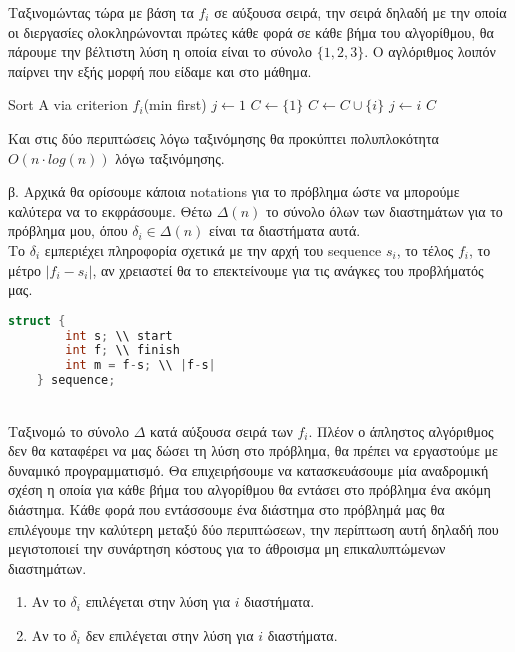 \documentclass{article} \usepackage[greek,english]{babel}
\begin{document}
Ταξινομώντας τώρα με βάση τα $f_i$ σε αύξουσα σειρά, την σειρά δηλαδή με την οποία οι διεργασίες ολοκληρώνονται
πρώτες κάθε φορά σε κάθε βήμα του αλγορίθμου, θα πάρουμε την βέλτιστη λύση η οποία είναι το σύνολο
$\{1,2,3\}$. Ο αγλόριθμος λοιπόν παίρνει την εξής μορφή που είδαμε και στο μάθημα. \\

    \begin{algorithm}
        \caption{$Sequences\_2(S)$}
        \begin{algorithmic}[1]
        \State Sort A via criterion $f_i$(min first)
        \State $j \leftarrow 1$
        \State $C \leftarrow \{1\}$ 
                \State $C \leftarrow C \cup \{i\}$
                \State $j \leftarrow i$
            \EndIf
        \EndFor
        \Return $C$

        \end{algorithmic}
    \end{algorithm}

Και στις δύο περιπτώσεις λόγω ταξινόμησης θα προκύπτει πολυπλοκότητα $O(n\cdot log(n))$ λόγω
ταξινόμησης.

\pagebreak

β. Αρχικά θα ορίσουμε κάποια notations για το πρόβλημα ώστε να μπορούμε καλύτερα να το εκφράσουμε.
Θέτω $\Delta(n)$ το σύνολο όλων των διαστημάτων για το πρόβλημα μου, όπου $\delta_i \in \Delta(n)$ είναι τα 
διαστήματα αυτά. \\
Το $\delta_i$ εμπεριέχει πληροφορία σχετικά με την αρχή του sequence $s_i$, το τέλος $f_i$, το μέτρο
$|f_i - s_i|$, αν χρειαστεί θα το επεκτείνουμε για τις ανάγκες του προβλήματός μας. \\

\begin{lstlisting}[language=C++]
    struct { 
        int s; \\ start
        int f; \\ finish
        int m = f-s; \\ |f-s|
    } sequence;
\end{lstlisting} \\

Ταξινομώ το σύνολο $\Delta$ κατά αύξουσα σειρά των $f_i$. Πλέον ο άπληστος αλγόριθμος δεν θα καταφέρει
να μας δώσει τη λύση στο πρόβλημα, θα πρέπει να εργαστούμε με δυναμικό προγραμματισμό. Θα επιχειρήσουμε
να κατασκευάσουμε μία αναδρομική σχέση η οποία για κάθε βήμα του αλγορίθμου θα εντάσει στο πρόβλημα
ένα ακόμη διάστημα. Κάθε φορά που εντάσσουμε ένα διάστημα στο πρόβλημά μας θα επιλέγουμε την καλύτερη 
μεταξύ δύο περιπτώσεων, την περίπτωση αυτή δηλαδή που μεγιστοποιεί την συνάρτηση κόστους για το άθροισμα
μη επικαλυπτώμενων διαστημάτων.\\
\begin{enumerate}
    \item{Αν το $\delta_i$ επιλέγεται στην λύση για $i$ διαστήματα.}
    \item{Αν το $\delta_i$ δεν επιλέγεται στην λύση για $i$ διαστήματα.}
\end{enumerate}
\end{document}
